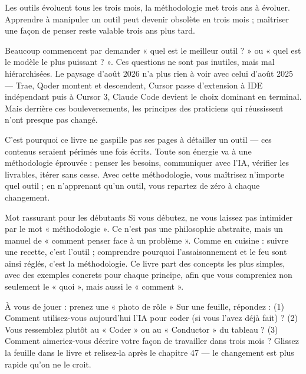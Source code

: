 
Les outils évoluent tous les trois mois, la méthodologie met trois ans à évoluer. Apprendre à manipuler un outil peut devenir obsolète en trois mois ; maîtriser une façon de penser reste valable trois ans plus tard.

Beaucoup commencent par demander « quel est le meilleur outil ? » ou « quel est le modèle le plus puissant ? ». Ces questions ne sont pas inutiles, mais mal hiérarchisées. Le paysage d'août 2026 n'a plus rien à voir avec celui d'août 2025 — Trae, Qoder montent et descendent, Cursor passe d'extension à IDE indépendant puis à Cursor 3, Claude Code devient le choix dominant en terminal. Mais derrière ces bouleversements, les principes des praticiens qui réussissent n'ont presque pas changé.

C'est pourquoi ce livre ne gaspille pas ses pages à détailler un outil — ces contenus seraient périmés une fois écrits. Toute son énergie va à une méthodologie éprouvée : penser les besoins, communiquer avec l'IA, vérifier les livrables, itérer sans cesse. Avec cette méthodologie, vous maîtrisez n'importe quel outil ; en n'apprenant qu'un outil, vous repartez de zéro à chaque changement.

\begin{tcbinfo}{Mot rassurant pour les débutants}
Si vous débutez, ne vous laissez pas intimider par le mot « méthodologie ». Ce n'est pas une philosophie abstraite, mais un manuel de « comment penser face à un problème ». Comme en cuisine : suivre une recette, c'est l'outil ; comprendre pourquoi l'assaisonnement et le feu sont ainsi réglés, c'est la méthodologie. Ce livre part des concepts les plus simples, avec des exemples concrets pour chaque principe, afin que vous compreniez non seulement le « quoi », mais aussi le « comment ».

\end{tcbinfo}

\begin{tcbpractice}{À vous de jouer : prenez une « photo de rôle »}
Sur une feuille, répondez : (1) Comment utilisez-vous aujourd'hui l'IA pour coder (si vous l'avez déjà fait) ? (2) Vous ressemblez plutôt au « Coder » ou au « Conductor » du tableau ? (3) Comment aimeriez-vous décrire votre façon de travailler dans trois mois ? Glissez la feuille dans le livre et relisez-la après le chapitre 47 — le changement est plus rapide qu'on ne le croit.

\end{tcbpractice}

